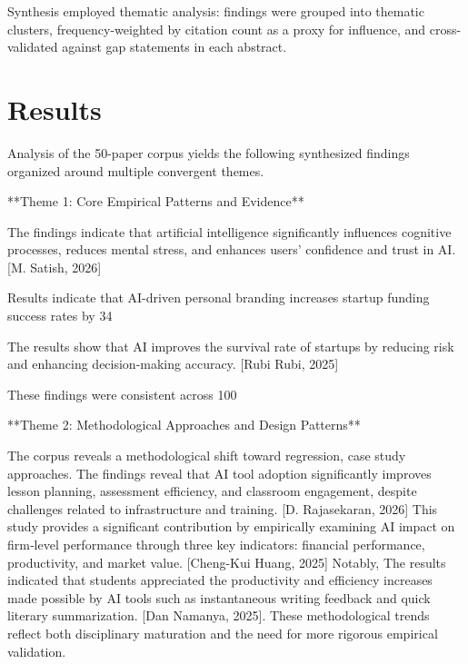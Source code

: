 \documentclass[11pt, a4paper]{article}
\begin{document}
Synthesis employed thematic analysis: findings were grouped into thematic clusters, frequency-weighted by citation count as a proxy for influence, and cross-validated against gap statements in each abstract.

\section{Results}
Analysis of the 50-paper corpus yields the following synthesized findings organized around multiple convergent themes.

**Theme 1: Core Empirical Patterns and Evidence**

The findings indicate that artificial intelligence significantly influences cognitive processes, reduces mental stress, and enhances users’ confidence and trust in AI. [M. Satish, 2026]

Results indicate that AI-driven personal branding increases startup funding success rates by 34%

The results show that AI improves the survival rate of startups by reducing risk and enhancing decision-making accuracy. [Rubi Rubi, 2025]

These findings were consistent across 100%

**Theme 2: Methodological Approaches and Design Patterns**

The corpus reveals a methodological shift toward regression, case study approaches. The findings reveal that AI tool adoption significantly improves lesson planning, assessment efficiency, and classroom engagement, despite challenges related to infrastructure and training. [D. Rajasekaran, 2026] This study provides a significant contribution by empirically examining AI impact on firm‐level performance through three key indicators: financial performance, productivity, and market value. [Cheng-Kui Huang, 2025] Notably, The results indicated that students appreciated the productivity and efficiency increases made possible by AI tools such as instantaneous writing feedback and quick literary summarization. [Dan Namanya, 2025]. These methodological trends reflect both disciplinary maturation and the need for more rigorous empirical validation.
\end{document}

